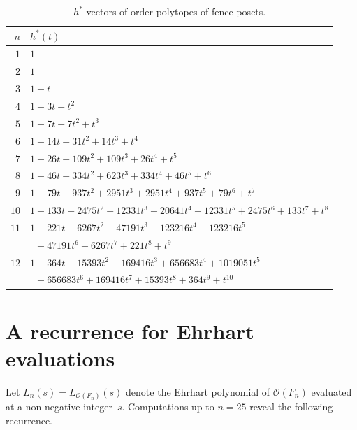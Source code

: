 \documentclass[11pt,reqno]{amsart}
\theoremstyle{definition}
\newcommand{\Ehr}{L}
\begin{document}
\begin{table}[!ht]
\centering
\small
\caption{$h^*$-vectors of order polytopes of fence posets.}
\label{tab:fenceHstar}
\begin{tabular}{@{}rl@{}}
\toprule
$n$ & $h^*(t)$ \\
\midrule
$1$ & $1$ \\
$2$ & $1$ \\
$3$ & $1 + t$ \\
$4$ & $1 + 3t + t^{2}$ \\
$5$ & $1 + 7t + 7t^{2} + t^{3}$ \\
$6$ & $1 + 14t + 31t^{2} + 14t^{3} + t^{4}$ \\
$7$ & $1 + 26t + 109t^{2} + 109t^{3} + 26t^{4} + t^{5}$ \\
$8$ & $1 + 46t + 334t^{2} + 623t^{3} + 334t^{4} + 46t^{5} + t^{6}$ \\
$9$ & $1 + 79t + 937t^{2} + 2951t^{3} + 2951t^{4} + 937t^{5} + 79t^{6} + t^{7}$ \\
$10$ & $1 + 133t + 2475t^{2} + 12331t^{3} + 20641t^{4} + 12331t^{5} + 2475t^{6} + 133t^{7} + t^{8}$ \\
$11$ & $1 + 221t + 6267t^{2} + 47191t^{3} + 123216t^{4} + 123216t^{5}$ \\
     & $\phantom{1} + 47191t^{6} + 6267t^{7} + 221t^{8} + t^{9}$ \\
$12$ & $1 + 364t + 15393t^{2} + 169416t^{3} + 656683t^{4} + 1019051t^{5}$ \\
     & $\phantom{1} + 656683t^{6} + 169416t^{7} + 15393t^{8} + 364t^{9} + t^{10}$ \\
\bottomrule
\end{tabular}
\end{table}


\section{A recurrence for Ehrhart evaluations}\label{sec:recurrence}

Let $L_n(s) = \Ehr_{\mathcal{O}(F_n)}(s)$ denote the Ehrhart polynomial
of $\mathcal{O}(F_n)$ evaluated at a non-negative integer~$s$.
Computations up to $n = 25$ reveal the following recurrence.
\end{document}
